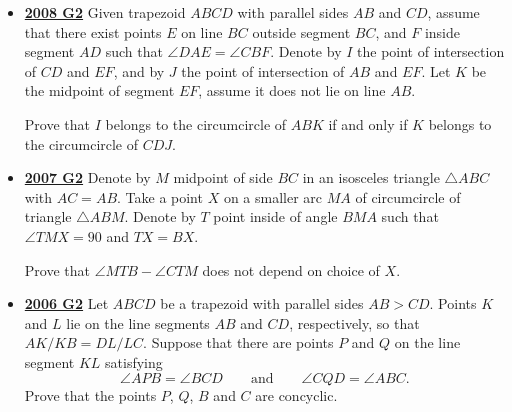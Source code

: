 \documentclass[11pt]{scrartcl}
\begin{document}
\begin{itemize}[leftmargin=*]
Prove that $ OP = OQ$.
\item \href{https://artofproblemsolving.com/community/c6h287864p1555917}{\textbf{2008 G2}} Given trapezoid $ ABCD$ with parallel sides $ AB$ and $ CD$, assume that there exist points $ E$ on line $ BC$ outside segment $ BC$, and $ F$ inside segment $ AD$ such that $ \angle DAE = \angle CBF$. Denote by $ I$ the point of intersection of $ CD$ and $ EF$, and by $ J$ the point of intersection of $ AB$ and $ EF$. Let $ K$ be the midpoint of segment $ EF$, assume it does not lie on line $ AB$. 

Prove that $ I$ belongs to the circumcircle of $ ABK$ if and only if $ K$ belongs to the circumcircle of $ CDJ$.
\item \href{https://artofproblemsolving.com/community/c6h207870p1143932}{\textbf{2007 G2}} Denote by $ M$ midpoint of side $ BC$ in an isosceles triangle $ \triangle ABC$ with $ AC = AB$. Take a point $ X$ on a smaller arc $MA$ of circumcircle of triangle $ \triangle ABM$. Denote by $ T$ point inside of angle $ BMA$ such that $ \angle TMX = 90$ and $ TX = BX$. 

Prove that $ \angle MTB - \angle CTM$ does not depend on choice of $ X$.
\item \href{https://artofproblemsolving.com/community/c6h155705p875014}{\textbf{2006 G2}} Let $ ABCD$ be a trapezoid with parallel sides $ AB > CD$. Points $ K$ and $ L$ lie on the line segments $ AB$ and $ CD$, respectively, so that $AK/KB=DL/LC$. Suppose that there are points $ P$ and $ Q$ on the line segment $ KL$ satisfying\[\angle{APB} = \angle{BCD}\qquad\text{and}\qquad \angle{CQD} = \angle{ABC}.\]Prove that the points $ P$, $ Q$, $ B$ and $ C$ are concyclic.
\end{itemize}

\newpage
\end{document}
